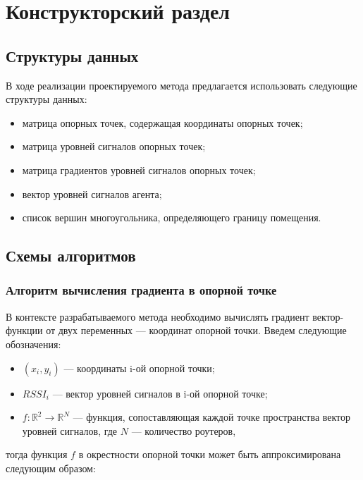 \chapter{Конструкторский раздел}

\section{Структуры данных}

В ходе реализации проектируемого метода предлагается использовать следующие структуры данных:

\begin{itemize}[label=---]
    \item матрица опорных точек, содержащая координаты опорных точек;
    \item матрица уровней сигналов опорных точек;
    \item матрица градиентов уровней сигналов опорных точек;
    \item вектор уровней сигналов агента;
    \item список вершин многоугольника, определяющего границу помещения.
\end{itemize}

\section{Схемы алгоритмов}

\subsection{Алгоритм вычисления градиента в опорной точке}

В контексте разрабатываемого метода необходимо вычислять градиент вектор-функции от двух переменных --- координат опорной точки. Введем следующие обозначения:

\begin{itemize}[label=---]
    \item $(x_i, y_i)$ --- координаты i-ой опорной точки;
    \item $RSSI_i$ --- вектор уровней сигналов в i-ой опорной точке;
    \item $f: \mathbb{R}^2 \rightarrow \mathbb{R}^N$ --- функция, сопоставляющая каждой точке пространства вектор уровней сигналов, где $N$ --- количество роутеров,
\end{itemize}
тогда функция $f$ в окрестности опорной точки может быть аппроксимирована следующим образом:

